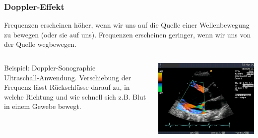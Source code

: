 \documentclass{beamer}
\begin{document}
\begin{frame}
\frametitle{Doppler-Effekt}

Frequenzen erscheinen höher, wenn wir uns auf die Quelle einer Wellenbewegung zu bewegen (oder sie auf uns). Frequenzen erscheinen geringer, wenn wir uns von der Quelle wegbewegen. 


\begin{columns}[c]

\pause

\begin{column}{5cm}

Beispiel: Doppler-Sonographie \\

Ultraschall-Anwendung. Verschiebung der Frequenz lässt Rückschlüsse darauf zu, in welche Richtung und wie schnell sich z.B. Blut in einem Gewebe bewegt.


\end{column}

\begin{column}{5cm}
\begin{center}
\includegraphics[width=\textwidth]{Tissue_Doppler.png}
\end{center}
\end{column}

\end{columns}

\end{frame}
\end{document}
